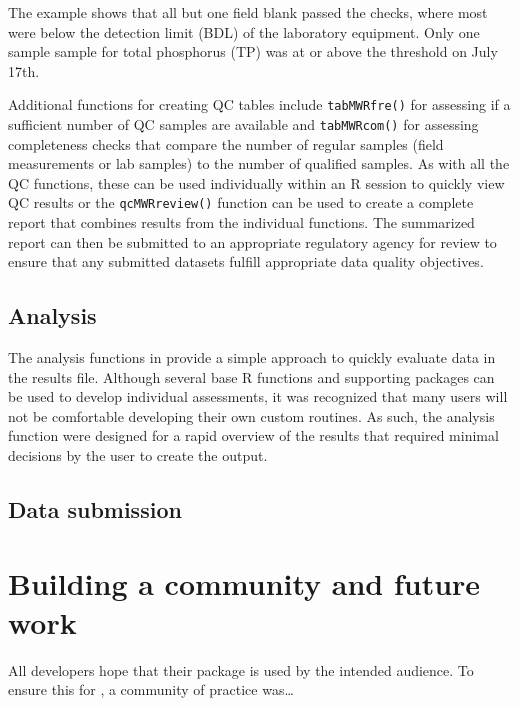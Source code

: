 \renewcommand*{\arraystretch}{1}

The example shows that all but one field blank passed the checks, where most were below the detection limit (BDL) of the laboratory equipment. Only one sample sample for total phosphorus (TP) was at or above the threshold on July 17th.

Additional functions for creating QC tables include \texttt{tabMWRfre()} for assessing if a sufficient number of QC samples are available and \texttt{tabMWRcom()} for assessing completeness checks that compare the number of regular samples (field measurements or lab samples) to the number of qualified samples. As with all the QC functions, these can be used individually within an R session to quickly view QC results or the \texttt{qcMWRreview()} function can be used to create a complete report that combines results from the individual functions. The summarized report can then be submitted to an appropriate regulatory agency for review to ensure that any submitted datasets fulfill appropriate data quality objectives.

\hypertarget{analysis}{%
\subsection{Analysis}\label{analysis}}

The analysis functions in  provide a simple approach to quickly evaluate data in the results file. Although several base R functions and supporting packages can be used to develop individual assessments, it was recognized that many users will not be comfortable developing their own custom routines. As such, the analysis function were designed for a rapid overview of the results that required minimal decisions by the user to create the output.

\hypertarget{data-submission}{%
\subsection{Data submission}\label{data-submission}}

\hypertarget{building-a-community-and-future-work}{%
\section{Building a community and future work}\label{building-a-community-and-future-work}}

All developers hope that their package is used by the intended audience. To ensure this for , a community of practice was\ldots{}

